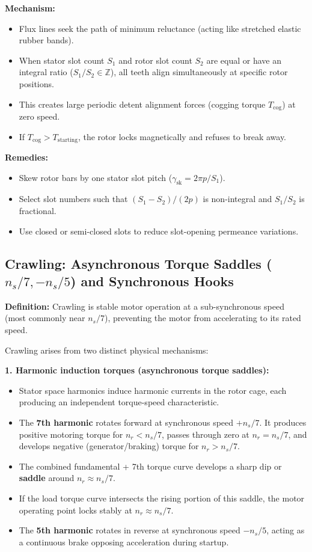 \textbf{Mechanism:}
\begin{itemize}
  \item Flux lines seek the path of minimum reluctance (acting like stretched elastic rubber bands).
  \item When stator slot count $S_1$ and rotor slot count $S_2$ are equal or have an integral ratio ($S_1/S_2 \in \mathbb{Z}$), all teeth align simultaneously at specific rotor positions.
  \item This creates large periodic detent alignment forces (cogging torque $T_{\mathrm{cog}}$) at zero speed.
  \item If $T_{\mathrm{cog}} > T_{\mathrm{starting}}$, the rotor locks magnetically and refuses to break away.
\end{itemize}
\textbf{Remedies:}
\begin{itemize}
  \item Skew rotor bars by one stator slot pitch ($\gamma_{\mathrm{sk}} = 2\pi p / S_1$).
  \item Select slot numbers such that $(S_1 - S_2)/(2p)$ is non-integral and $S_1/S_2$ is fractional.
  \item Use closed or semi-closed slots to reduce slot-opening permeance variations.
\end{itemize}

\subsection{Crawling: Asynchronous Torque Saddles (\texorpdfstring{$n_s/7, -n_s/5$}{ns/7, -ns/5}) and Synchronous Hooks}
\textbf{Definition:} Crawling is stable motor operation at a sub-synchronous speed (most commonly near $n_s/7$), preventing the motor from accelerating to its rated speed.

Crawling arises from two distinct physical mechanisms:

\textbf{1. Harmonic induction torques (asynchronous torque saddles):}
\begin{itemize}
  \item Stator space harmonics induce harmonic currents in the rotor cage, each producing an independent torque-speed characteristic.
  \item The \textbf{7th harmonic} rotates forward at synchronous speed $+n_s/7$. It produces positive motoring torque for $n_r < n_s/7$, passes through zero at $n_r = n_s/7$, and develops negative (generator/braking) torque for $n_r > n_s/7$.
  \item The combined fundamental + 7th torque curve develops a sharp dip or \textbf{saddle} around $n_r \approx n_s/7$.
  \item If the load torque curve intersects the rising portion of this saddle, the motor operating point locks stably at $n_r \approx n_s/7$.
  \item The \textbf{5th harmonic} rotates in reverse at synchronous speed $-n_s/5$, acting as a continuous brake opposing acceleration during startup.
\end{itemize}

